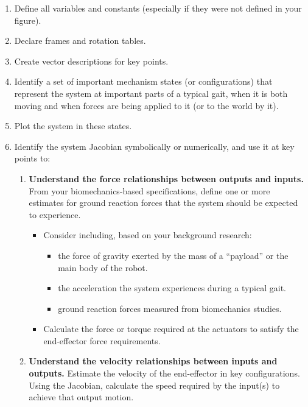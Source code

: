 \documentclass[12pt]{article}
\begin{document}
\begin{enumerate}
    \item Define all variables and constants (especially if they were not defined in your figure).
    \item Declare frames and rotation tables.
    \item Create vector descriptions for key points.
    \item Identify a set of important mechanism states (or configurations) that represent the system at important parts of a typical gait, when it is both moving and when forces are being applied to it (or to the world by it).
    \item Plot the system in these states.
    \item Identify the system Jacobian symbolically or numerically, and use it at key points to:
    \begin{enumerate}
        \item \textbf{Understand the force relationships between outputs and inputs.} From your biomechanics-based specifications, define one or more estimates for ground reaction forces that the system should be expected to experience.
        \begin{itemize}
            \item Consider including, based on your background research:
            \begin{itemize}
                \item the force of gravity exerted by the mass of a “payload” or the main body of the robot.
                \item the acceleration the system experiences during a typical gait.
                \item ground reaction forces measured from biomechanics studies.
            \end{itemize}
            \item Calculate the force or torque required at the actuators to satisfy the end-effector force requirements.
        \end{itemize}
        
        \item \textbf{Understand the velocity relationships between inputs and outputs.} Estimate the velocity of the end-effector in key configurations. Using the Jacobian, calculate the speed required by the input(s) to achieve that output motion.
    \end{enumerate}
    
    \begin{center}
    \end{center}
    

\end{enumerate}
\end{document}
